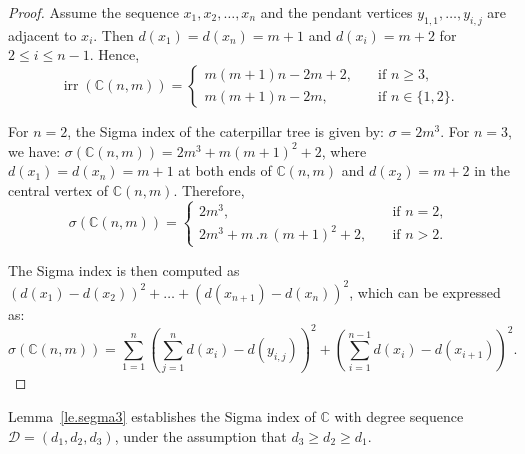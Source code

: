 \documentclass[12pt, a4paper]{article}
\theoremstyle{plain}  %
\theoremstyle{definition}  %
\newcommand{\CC}{\mathbb{C}}
\begin{document}
\begin{proof}
Assume the sequence $x_1, x_2, \dots, x_n$ and the pendant vertices $y_{1,1}, \dots, y_{i,j}$ are adjacent to $x_i$. Then $d(x_1) = d(x_n) = m+1$ and $d(x_i)=m+2$ for $2 \leqslant i \leqslant n-1$. Hence, 
\[
\operatorname{irr}(\CC(n,m)) = \begin{cases} 
m(m+1)n - 2m + 2, & \quad \text{if } n \geqslant 3, \\
m(m+1)n - 2m, & \quad \text{if } n \in \{1,2\}.
\end{cases}
\]

For $n = 2$, the Sigma index of the caterpillar tree is given by: $\sigma = 2m^3$.  
For $n = 3$, we have: $\sigma(\CC(n,m)) = 2m^3 + m(m+1)^2+2$, where $d(x_1)=d(x_n)=m+1$ at both ends of $\CC(n,m)$ and $d(x_2)=m+2$ in the central vertex of $\CC(n,m)$.  
Therefore, 
\[
\sigma(\CC(n,m)) = \begin{cases}
2m^3, & \quad \text{if } n = 2, \\
2m^3 + m\,.n\,(m+1)^2+2, & \quad \text{if } n> 2.
\end{cases}
\]

The Sigma index is then computed as $(d(x_1) - d (x_2))^2 + \dots + (d (x_{n+1}) - d (x_n))^2$, which can be expressed as:
\[
\sigma(\CC(n,m)) = \sum_{1=1}^n\left( \sum_{j=1}^n d(x_i) - d (y_{i,j}) \right)^2+\left( \sum_{i=1}^{n-1} d(x_i) - d (x_{i+1}) \right)^2.
\]
\end{proof}

Lemma~\ref{le.segma3} establishes the Sigma index of $\CC$ with degree sequence $\mathscr{D} = (d_1, d_2, d_3)$, under the assumption that $d_3 \geqslant d_2 \geqslant d_1$.
\end{document}
